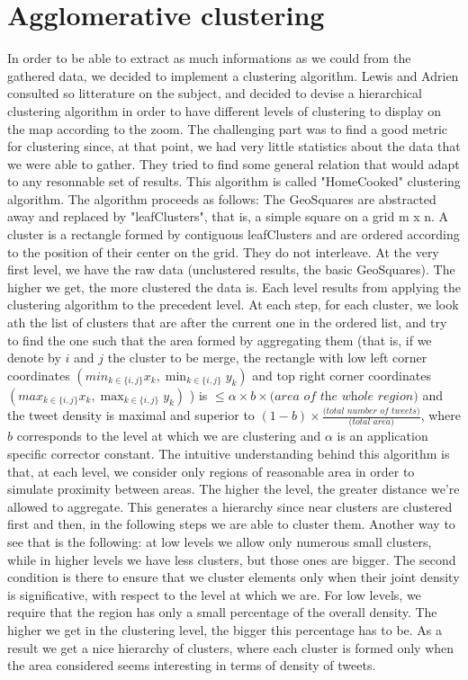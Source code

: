 \section{ Agglomerative clustering}
\label{sec:agg_clustering}
In order to be able to extract as much informations as we could from the gathered data, we decided to implement a clustering algorithm. Lewis and Adrien consulted so litterature on the subject, and decided to devise a hierarchical clustering algorithm in order to have different levels of clustering to display on the map according to the zoom. 
The challenging part was to find a good metric for clustering since, at that point, we had very little statistics about the data that we were able to gather. They tried to find some general relation that would adapt to any resonnable set of results. This algorithm is called "HomeCooked" clustering algorithm.
The algorithm proceeds as follows: 
The GeoSquares are abstracted away and replaced by "leafClusters", that is, a simple square on a grid m x n. A cluster is a rectangle formed by contiguous leafClusters and are ordered according to the position of their center on the grid. They do not interleave. 
At the very first level, we have the raw data (unclustered results, the basic GeoSquares). The higher we get, the more clustered the data is. 
Each level results from applying the clustering algorithm to the precedent level. 
At each step, for each cluster, we look ath the list of clusters that are after the current one in the ordered list, and try to find the one such that the area formed by aggregating them (that is, if we denote by $i$ and $j$ the cluster to be merge, the rectangle with low left corner coordinates $(min_{k\in \{i,j\} } x_k, \min_{k\in \{i,j\}} y_k )$ and top right corner coordinates $(max_{k\in \{i,j\}} x_k, \max_{k\in \{i,j\} } y_k)$ ) is $\leq \alpha \times b \times \textit{(area of the whole region)}$ and the tweet density is maximal and superior to $(1-b)\times \frac{\textit{(total number of tweets)}}{\textit{(total area)}}$, where $b$ corresponds to the level at which we are clustering and $\alpha$ is an application specific corrector constant. 
The intuitive understanding behind this algorithm is that, at each level, we consider only regions of reasonable area in order to simulate proximity between areas. The higher the level, the greater distance we're allowed to aggregate. This generates a hierarchy since near clusters are clustered first and then, in the following steps we are able to cluster them. Another way to see that is the following: at low levels we allow only numerous small clusters, while in higher levels we have less clusters, but those ones are bigger. The second condition is there to ensure that we cluster elements only when their joint density is significative, with respect to the level at which we are. For low levels, we require that the region has only a small percentage of the overall density. The higher we get in the clustering level, the bigger this percentage has to be. As a result we get a nice hierarchy of clusters, where each cluster is formed only when the area considered seems interesting in terms of density of tweets. 
